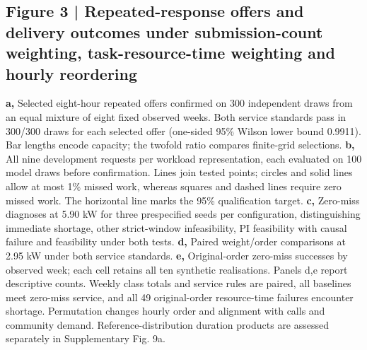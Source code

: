 \documentclass[10pt,a4paper]{article}
\begin{document}
\begin{minipage}{\textwidth}
\subsection*{Figure 3 | Repeated-response offers and delivery outcomes under submission-count weighting, task-resource-time weighting and hourly reordering}

\textbf{a,} Selected eight-hour repeated offers confirmed on 300 independent draws from an equal mixture of eight fixed observed weeks. Both service standards pass in 300/300 draws for each selected offer (one-sided 95\% Wilson lower bound 0.9911). Bar lengths encode capacity; the twofold ratio compares finite-grid selections. \textbf{b,} All nine development requests per workload representation, each evaluated on 100 model draws before confirmation. Lines join tested points; circles and solid lines allow at most 1\% missed work, whereas squares and dashed lines require zero missed work. The horizontal line marks the 95\% qualification target. \textbf{c,} Zero-miss diagnoses at 5.90 kW for three prespecified seeds per configuration, distinguishing immediate shortage, other strict-window infeasibility, PI feasibility with causal failure and feasibility under both tests. \textbf{d,} Paired weight/order comparisons at 2.95 kW under both service standards. \textbf{e,} Original-order zero-miss successes by observed week; each cell retains all ten synthetic realisations. Panels d,e report descriptive counts. Weekly class totals and service rules are paired, all baselines meet zero-miss service, and all 49 original-order resource-time failures encounter shortage. Permutation changes hourly order and alignment with calls and community demand. Reference-distribution duration products are assessed separately in Supplementary Fig. 9a.
\end{minipage}\par\vspace{7pt}
\end{document}
